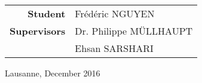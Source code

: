 \begin{titlepage}
\begin{table}[H]
\sffamily
\centering
\begin{tabular}{@{}r|l@{}}
\textbf{Student}     & Frédéric NGUYEN        \\
\textbf{Supervisors} & Dr. Philippe MÜLLHAUPT \\
                     & Ehsan SARSHARI        
\end{tabular}
\end{table}
\vspace{2cm}

\vfill
{Lausanne, December 2016}\\[.5cm] %


 

\vfill %

\end{titlepage}